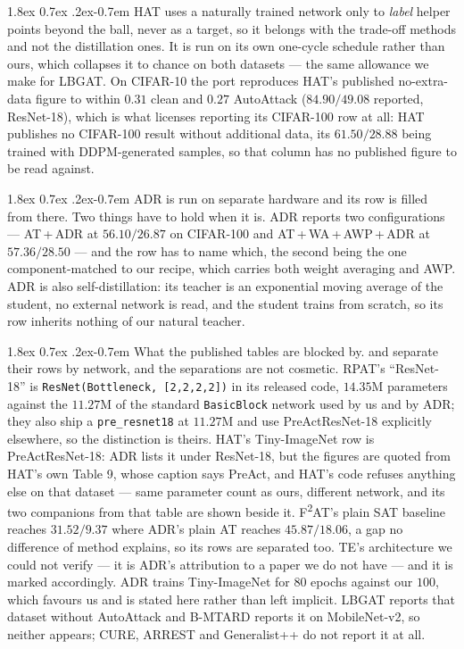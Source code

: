 \documentclass{article} %
\makeatletter
\theoremstyle{plain}
\renewcommand{\paragraph}{\@startsection{paragraph}{4}{\z@}%
  {1.8ex \@plus 0.7ex \@minus .2ex}{-0.7em}%
  {\normalfont\normalsize\bfseries}}
\makeatother
\begin{document}
\paragraph{HAT} uses a naturally trained network only to \emph{label} helper points beyond the ball,
never as a target, so it belongs with the trade-off methods and not the distillation ones. It is run
on its own one-cycle schedule rather than ours, which collapses it to chance on both datasets --- the
same allowance we make for LBGAT. On CIFAR-10 the port reproduces HAT's published no-extra-data figure
to within $0.31$ clean and $0.27$ AutoAttack ($84.90 / 49.08$ reported, ResNet-18), which is what
licenses reporting its CIFAR-100 row at all: HAT publishes no CIFAR-100 result without additional data,
its $61.50 / 28.88$ being trained with DDPM-generated samples, so that column has no published figure
to be read against.

\paragraph{ADR} is run on separate hardware and its row is filled from there. Two things have to hold
when it is. ADR reports two configurations --- AT\,+\,ADR at $56.10 / 26.87$ on CIFAR-100 and
AT\,+\,WA\,+\,AWP\,+\,ADR at $57.36 / 28.50$ --- and the row has to name which, the second being the
one component-matched to our recipe, which carries both weight averaging and AWP. ADR is also
self-distillation: its teacher is an exponential moving average of the student, no external network is
read, and the student trains from scratch, so its row inherits nothing of our natural teacher.

\paragraph{What the published tables are blocked by.}  and
 separate their rows by network, and the separations are not cosmetic. RPAT's
``ResNet-18'' is \texttt{ResNet(Bottleneck, [2,2,2,2])} in its released code, $14.35$M parameters
against the $11.27$M of the standard \texttt{BasicBlock} network used by us and by ADR; they also ship
a \texttt{pre\_resnet18} at $11.27$M and use PreActResNet-18 explicitly elsewhere, so the distinction
is theirs. HAT's Tiny-ImageNet row is PreActResNet-18: ADR lists it under ResNet-18, but the figures
are quoted from HAT's own Table 9, whose caption says PreAct, and HAT's code refuses anything else on
that dataset --- same parameter count as ours, different network, and its two companions from that
table are shown beside it. F\textsuperscript{2}AT's plain SAT baseline reaches $31.52 / 9.37$ where
ADR's plain AT reaches $45.87 / 18.06$, a gap no difference of method explains, so its rows are
separated too. TE's architecture we could not verify --- it is ADR's attribution to a paper we do not
have --- and it is marked accordingly. ADR trains Tiny-ImageNet for $80$ epochs against our $100$,
which favours us and is stated here rather than left implicit. LBGAT reports that dataset without
AutoAttack and B-MTARD reports it on MobileNet-v2, so neither appears; CURE, ARREST and Generalist++
do not report it at all.
\end{document}
